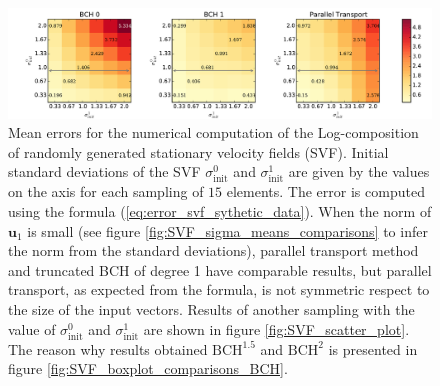 \begin{figure}[!ht]
	\hspace{-2.1cm}
	\includegraphics[scale=0.55]{figures/SVF_image_scale.pdf}
	\caption{Mean errors for the numerical computation of the Log-composition of randomly generated stationary velocity fields (SVF). Initial standard deviations of the SVF $\sigma_{\text{init}}^{0}$ and $\sigma_{\text{init}}^{1}$ are given by the values on the axis for each sampling of $15$ elements. The error is computed using the formula (\ref{eq:error_svf_sythetic_data}). When the norm of $\mathbf{u}_1$ is small (see figure \ref{fig:SVF_sigma_means_comparisons} to infer the norm from the standard deviations), parallel transport method and truncated BCH of degree 1 have comparable results, but parallel transport, as expected from the formula, is not symmetric respect to the size of the input vectors. Results of another sampling with the value of $\sigma_{\text{init}}^{0}$ and $\sigma_{\text{init}}^{1}$ are shown in figure \ref{fig:SVF_scatter_plot}. The reason why results obtained $\text{BCH}^{1.5}$ and $\text{BCH}^{2}$ is presented in figure \ref{fig:SVF_boxplot_comparisons_BCH}.}
	\label{fig:SVF_image_scale}
\end{figure}

